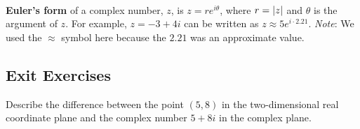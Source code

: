 \begin{myDefinition}~\\[0.5mm]
\textbf{Euler's form} of a complex number, $z$, is $z=re^{i\theta}$, where $r=\lvert z\rvert$ and $\theta$ is the argument of $z$. 
\newline For example, $z=-3+4i$ can be written as $z\approx5e^{i\cdot2.21}$. 
\newline \emph{Note}: We used the $\approx$ symbol here because the $2.21$ was an approximate value.
\end{myDefinition}

\newpage

\subsection*{Exit Exercises} \label{exit-exercises-section-complex-numbers}

\begin{myExit}
	Describe the difference between the point $(5,8)$ in the two-dimensional real coordinate plane and the complex number $5+8i$ in the complex plane.
\end{myExit}

